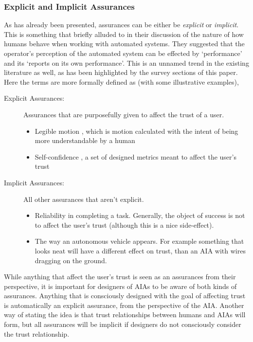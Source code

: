 \subsubsection{Explicit and Implicit Assurances}
As has already been presented, assurances can be either be \emph{explicit} or \emph{implicit}. This is something that \cite{Sheridan1984-kx} briefly alluded to in their discussion of the nature of how humans behave when working with automated systems. They suggested that the operator's perception of the automated system can be effected by `performance' and its `reports on its own performance'. This is an unnamed trend in the existing literature as well, as has been highlighted by the survey sections of this paper. Here the terms are more formally defined as (with some illustrative examples),

\begin{description}
    \item [Explicit Assurances:] Assurances that are purposefully given to affect the trust of a user.
    \begin{itemize}
        \item Legible motion \cite{Dragan2013-wd}, which is motion calculated with the intent of being more understandable by a human
        \item Self-confidence \cite{Aitken2016-fb}, a set of designed metrics meant to affect the user's trust
    \end{itemize}
    \item [Implicit Assurances:] All other assurances that aren't explicit.
    \begin{itemize}
        \item Reliability in completing a task. Generally, the object of success is not to affect the user's trust (although this is a nice side-effect).
        \item The way an autonomous vehicle appears. For example something that looks neat will have a different effect on trust, than an AIA with wires dragging on the ground. 
    \end{itemize}
\end{description}

While anything that affect the user's trust is seen as an assurances from their perspective, it is important for designers of AIAs to be aware of both kinds of assurances. Anything that is consciously designed with the goal of affecting trust is automatically an explicit assurance, from the perspective of the AIA. Another way of stating the idea is that trust relationships between humans and AIAs will form, but all assurances will be implicit if designers do not consciously consider the trust relationship. 
%
